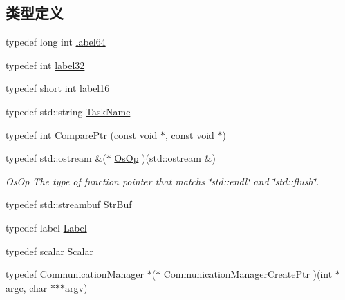 \subsection*{类型定义}
\begin{DoxyCompactItemize}
\item 
typedef long int \hyperlink{namespaceHSF_a650f5d5e5fa910ac122802bc38916ca9}{label64}
\item 
typedef int \hyperlink{namespaceHSF_afc477bc8f9a048e05aa8a6d017cf8cae}{label32}
\item 
typedef short int \hyperlink{namespaceHSF_aa78ed21ca4d118cc69c8d1451a4a95f5}{label16}
\item 
typedef std::string \hyperlink{namespaceHSF_a928eb958edfcd09f62de19e9cd3bac70}{TaskName}
\item 
typedef int \hyperlink{namespaceHSF_ad5c260e0fc81004bced4ebf9662faf7f}{ComparePtr} (const void $\ast$, const void $\ast$)
\item 
typedef std::ostream \&($\ast$ \hyperlink{namespaceHSF_a5c97750573f23c09a9fed0efa5baa52d}{OsOp} )(std::ostream \&)
\begin{DoxyCompactList}\small\item\em OsOp The type of function pointer that matchs \char`\"{}std::endl\char`\"{} and \char`\"{}std::flush\char`\"{}. \item\end{DoxyCompactList}\item 
typedef std::streambuf \hyperlink{namespaceHSF_a099dd77b4cb045fbbd0fb0dd0946e198}{StrBuf}
\item 
typedef label \hyperlink{namespaceHSF_ae65d72be782e989396ebe5ec6ae4c2b6}{Label}
\item 
typedef scalar \hyperlink{namespaceHSF_a7419497552ed1c5631a818b75eed1aec}{Scalar}
\item 
typedef \hyperlink{classHSF_1_1CommunicationManager}{CommunicationManager} $\ast$($\ast$ \hyperlink{namespaceHSF_ab45d53c3824fdb265043e9e65c1665b5}{CommunicationManagerCreatePtr} )(int $\ast$argc, char $\ast$$\ast$$\ast$argv)
\end{DoxyCompactItemize}
